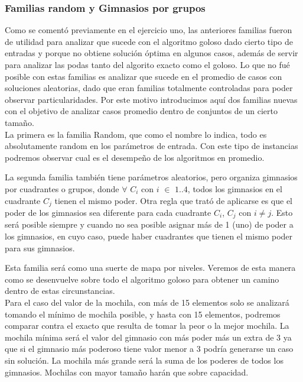 \subsubsection{Familias random y Gimnasios por grupos}

Como se comentó previamente en el ejercicio uno, las anteriores familias fueron de utilidad para analizar que sucede con el algoritmo goloso dado cierto tipo de entradas y porque no obtiene solución óptima en algunos casos, además de servir para analizar las podas tanto del algorito exacto como el goloso. Lo que no fué posible con estas familias es analizar que sucede en el promedio de casos con soluciones aleatorias, dado que eran familias totalmente controladas para poder observar particularidades. Por este motivo introducimos aquí dos familias nuevas con el objetivo de analizar casos promedio dentro de conjuntos de un cierto tamaño.\\

La primera es la familia Random, que como el nombre lo indica, todo es absolutamente random en los parámetros de entrada. Con este tipo de instancias podremos observar cual es el desempeño de los algoritmos en promedio.

La segunda familia también tiene parámetros aleatorios, pero organiza gimnasios por cuadrantes o grupos, donde $\forall$ $C_i$ con $i$ $\in$ ${1..4}$, todos los gimnasios en el cuadrante $C_j$ tienen el mismo poder. Otra regla que trató de aplicarse es que el poder de los gimnasios sea diferente para cada cuadrante $C_i$, $C_j$ con $i \neq j$. Esto será posible siempre y cuando no sea posible asignar m\'as de 1 (uno) de poder a los gimnasios, en cuyo caso, puede haber cuadrantes que tienen el mismo poder para sus gimnasios.

Esta familia será como una suerte de mapa por niveles. Veremos de esta manera como se desenvuelve sobre todo el algoritmo goloso para obtener un camino dentro de estas circunstancias.\\

Para el caso del valor de la mochila, con más de 15 elementos solo se analizará tomando el mínimo de mochila posible, y hasta con 15 elementos, podremos comparar contra el exacto que resulta de tomar la peor o la mejor mochila.
La mochila mínima será el valor del gimnasio con más poder más un extra de 3 ya que si el gimnasio más poderoso tiene valor menor a 3 podría generarse un caso sin solución. La mochila más grande será la suma de los poderes de todos los gimnasios. Mochilas con mayor tamaño harán que sobre capacidad.\\

